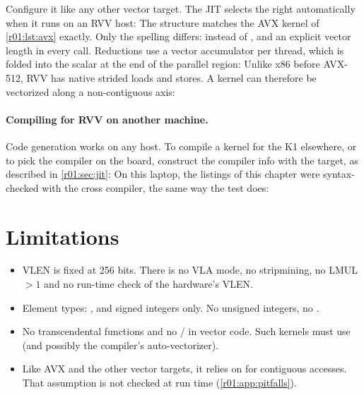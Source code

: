 Configure it like any other vector target. The JIT selects the right 
automatically when it runs on an RVV host:
The structure matches the AVX kernel of \cref{r01:lst:avx} exactly. Only the spelling
differs:  instead of , and an explicit 
vector length in every call. Reductions use a vector accumulator per thread, which is
folded into the scalar at the end of the parallel region:
Unlike x86 before AVX-512, RVV has native strided loads and stores. A kernel can
therefore be vectorized along a non-contiguous axis:

\paragraph{Compiling for RVV on another machine.}
Code generation works on any host. To compile a kernel for the K1 elsewhere, or to pick
the compiler on the board, construct the compiler info with the target, as described in
\cref{r01:sec:jit}:
On this laptop, the listings of this chapter were syntax-checked with the cross
compiler, the same way the test  does:

\section{Limitations}
\begin{itemize}
  \item VLEN is fixed at 256 bits. There is no VLA mode, no stripmining, no LMUL $>1$
        and no run-time check of the hardware's VLEN.
  \item Element types: ,  and signed integers only. No
        unsigned integers, no .
  \item No transcendental functions and no / in vector code. Such
        kernels must use  (and possibly the compiler's
        auto-vectorizer).
  \item Like AVX and the other vector targets, it relies on
         for contiguous accesses. That assumption is not
        checked at run time (\cref{r01:app:pitfalls}).
\end{itemize}

